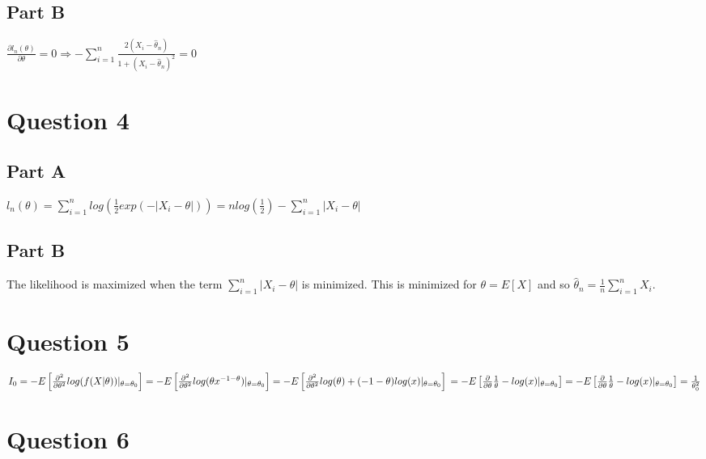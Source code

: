 \documentclass[11pt]{article} %
\begin{document}
\subsection{Part B}
$\frac{\partial l_n(\theta)}{\partial \theta} = 0 \Rightarrow -\sum_{i=1}^n \frac{2(X_i - \hat{\theta}_n)}{1 +(X_i- \hat{\theta}_n)^2 } = 0$
\section{Question 4} %
\subsection{Part A}
$l_n(\theta) = \sum_{i=1}^n log(\frac{1}{2} exp(-|X_i-\theta|)) = n log(\frac{1}{2})  -\sum_{i=1}^n |X_i-\theta|$
\subsection{Part B}
The likelihood is maximized when the term $\sum_{i=1}^n |X_i-\theta|$ is minimized. This is minimized for $\theta = E[X]$ and so $\hat{\theta}_n = \frac{1}{n}\sum_{i=1}^n X_i.$
\section{Question 5} %
$I_0 = -E\left[ \frac{\partial^2}{\partial \theta^2} log(f(X|\theta))|_{\theta = \theta_0}\right] = -E\left[ \frac{\partial^2}{\partial \theta^2} log(\theta x^{-1-\theta})|_{\theta = \theta_0}\right] = -E\left[ \frac{\partial^2}{\partial \theta^2} log(\theta)+(-1-\theta)log(x)|_{\theta = \theta_0}\right] \\ 
= -E\left[ \frac{\partial}{\partial \theta} \frac{1}{\theta}-log(x)|_{\theta = \theta_0}\right] =  -E\left[ \frac{\partial}{\partial \theta} \frac{1}{\theta}-log(x)|_{\theta = \theta_0}\right] = \frac{1}{\theta_0^2}$%
\section{Question 6} %
\end{document}
